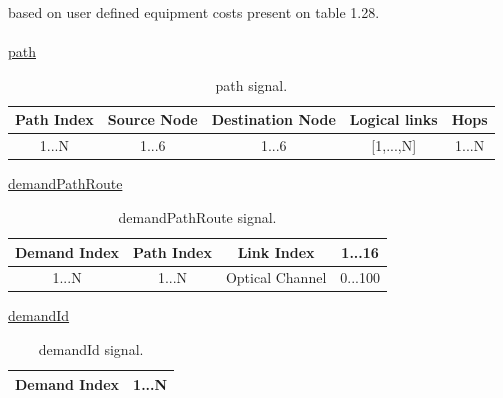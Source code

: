 based on user defined equipment costs present on table 1.28.\\ \\
\underline{path}\\
\begin{table}[H]
	\centering
	\begin{tabular}{|c|c|c|c|c|}
		\hline
		Path Index & Source Node & Destination Node & Logical links & Hops\\ \hline
		1...N      & 1...6       & 1...6  & [1,...,N]  & 1...N       \\ \hline
	\end{tabular}
	\caption{path signal.}
	\label{path_signal}
\end{table}

\underline{demandPathRoute}\\
\begin{table}[H]
	\centering
	\begin{tabular}{|c|c|c|c|}
		\hline
		Demand Index           & Path Index             & Link Index                       & 1...16                   \\ \hline
		\multirow{2}{*}{1...N} & \multirow{2}{*}{1...N} & \multirow{2}{*}{Optical Channel} & \multirow{2}{*}{0...100} \\
		&                        &                                  &                          \\ \hline
	\end{tabular}
	\caption{demandPathRoute signal.}
	\label{demandPathRoute_signal}
\end{table}
\underline{demandId}\\
\begin{table}[H]
	\centering
	\begin{tabular}{|c|c|}
		\hline
		Demand Index & 1...N \\ \hline
	\end{tabular}
	\caption{demandId signal.}
	\label{demandId_signal}
\end{table}

